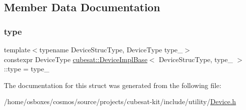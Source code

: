 \subsection{Member Data Documentation}
\mbox{\label{structcubesat_1_1DeviceImplBase_a89e98fe7649db65d02679b06aa84d7c9}} 
\subsubsection{\texorpdfstring{type}{type}}
{\footnotesize\ttfamily template$<$typename Device\+Struc\+Type, Device\+Type type\+\_\+$>$ \\
constexpr Device\+Type \hyperlink{structcubesat_1_1DeviceImplBase}{cubesat\+::\+Device\+Impl\+Base}$<$ Device\+Struc\+Type, type\+\_\+ $>$\+::type = type\+\_\+\hspace{0.3cm}{\ttfamily [static]}}



The documentation for this struct was generated from the following file\+:\begin{DoxyCompactItemize}
\item 
/home/osboxes/cosmos/source/projects/cubesat-\/kit/include/utility/\hyperlink{Device_8h}{Device.\+h}\end{DoxyCompactItemize}
